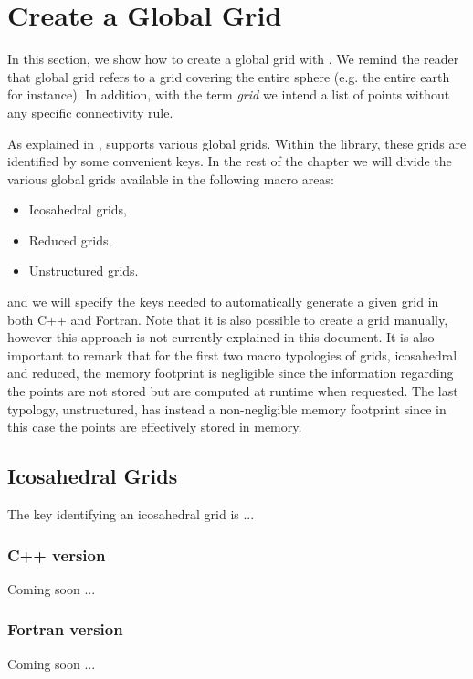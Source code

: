 \chapter{Create a Global Grid}
\label{chap:global-grids}
In this section, we show how to create a global grid with \Atlas.
We remind the reader that global grid refers to a grid covering 
the entire sphere (e.g. the entire earth for instance).
In addition, with the term \textit{grid} we intend a 
list of points without any specific connectivity rule.

As explained in , \Atlas supports various 
global grids. Within the library, these grids are identified 
by some convenient keys. In the rest of the chapter we will 
divide the various global grids available in the following 
macro areas:
%
\begin{itemize}
\item Icosahedral grids,
\item Reduced grids,
\item Unstructured grids.
\end{itemize} 
%
and we will specify the keys needed to automatically generate 
a given grid in both C++ and Fortran. Note that it is also possible 
to create a grid manually, however this approach is not currently 
explained in this document.
It is also important to remark that for the first two macro typologies 
of grids, icosahedral and reduced, the memory footprint is negligible 
since the information regarding the points are not stored but are computed
at runtime when requested.
The last typology, unstructured, has instead a non-negligible memory 
footprint since in this case the points are effectively stored in memory.



\section{Icosahedral Grids}
The key identifying an icosahedral grid is ...
 
\subsection{C++ version}
Coming soon ...

\subsection{Fortran version}
Coming soon ...



